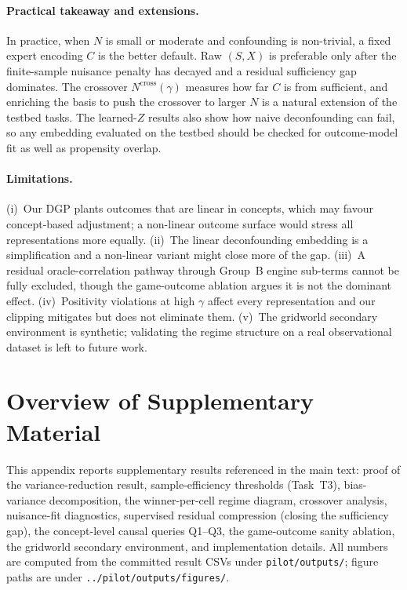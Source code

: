 \documentclass{article}
\begin{document}
\paragraph{Practical takeaway and extensions.}
In practice, when $N$ is small or moderate and confounding is non-trivial, a
fixed expert encoding $C$ is the better default. Raw $(S,X)$ is preferable only
after the finite-sample nuisance penalty has decayed and a residual sufficiency
gap dominates. The crossover $N^{\text{cross}}(\gamma)$ measures how far $C$ is
from sufficient, and enriching the basis to push the crossover to larger $N$
is a natural extension of the testbed tasks. The learned-$Z$ results also show
how naive deconfounding can fail, so any embedding evaluated on the testbed
should be checked for outcome-model fit as well as propensity overlap.

\paragraph{Limitations.}
(i)~Our DGP plants outcomes that are linear in concepts, which may favour
concept-based adjustment; a non-linear outcome surface would stress all
representations more equally. (ii)~The linear deconfounding embedding is a
simplification and a non-linear variant might close more of the gap. (iii)~A
residual oracle-correlation pathway through Group~B engine sub-terms cannot be
fully excluded, though the game-outcome ablation argues it is not the dominant
effect. (iv)~Positivity violations at high $\gamma$ affect every representation
and our clipping mitigates but does not eliminate them. (v)~The gridworld
secondary environment is synthetic; validating the regime structure on a real
observational dataset is left to future work.




\appendix

\section{Overview of Supplementary Material}
This appendix reports supplementary results referenced in the main text:
proof of the variance-reduction result, sample-efficiency thresholds (Task~T3),
bias-variance decomposition, the winner-per-cell regime diagram, crossover
analysis, nuisance-fit diagnostics, supervised residual compression
(closing the sufficiency gap), the concept-level causal queries Q1--Q3, the
game-outcome sanity ablation, the gridworld secondary environment, and
implementation details. All numbers are computed from the committed result
CSVs under \texttt{pilot/outputs/}; figure paths are under
\texttt{../pilot/outputs/figures/}.
\end{document}
